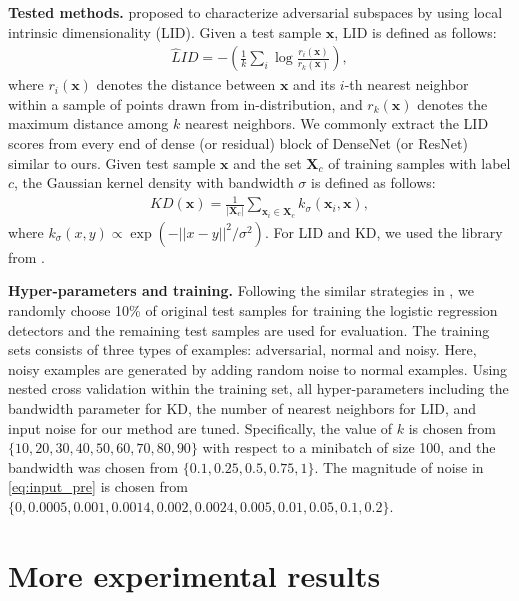 \documentclass{article}
\begin{document}
{\bf Tested methods.} \citet{ma2018characterizing} proposed to characterize adversarial subspaces by using local intrinsic dimensionality (LID). Given a test sample $\mathbf{x}$,
LID is defined as follows:
\begin{align*}
  {\widehat LID} = - \left( \frac{1}{k} \sum_i \log \frac{r_i(\mathbf{x})}{r_k(\mathbf{x})} \right),
\end{align*}
where $r_i(\mathbf{x})$ denotes the distance between $\mathbf{x}$ and its $i$-th nearest neighbor within a sample of points drawn from in-distribution, and $r_k(\mathbf{x})$ denotes the maximum distance among $k$ nearest neighbors.
We commonly extract the LID scores from every end of dense (or residual) block of DenseNet (or ResNet) similar to ours.
Given test sample $\mathbf{x}$ and the set $\mathbf{X}_c$ of training samples with label $c$,
the Gaussian kernel density with bandwidth $\sigma$ is defined as follows:
\begin{align*}
  KD(\mathbf{x}) = \frac{1}{|\mathbf{X}_c|} \sum_{\mathbf{x}_i \in \mathbf{X}_c} k_{\sigma}(\mathbf{x}_i,\mathbf{x}),
\end{align*}
where $k_{\sigma}(x,y) \propto \exp(-||x-y||^2/\sigma^2)$.
For LID and KD, we used the library from \citet{ma2018characterizing}.

{\bf Hyper-parameters and training.} Following the similar strategies in \citep{feinman2017detecting, ma2018characterizing},
we randomly choose 10\% of original test samples for training the logistic regression detectors and the remaining test samples are used for evaluation.
The training sets consists of three types of examples: adversarial, normal and noisy.
Here, noisy examples are generated by adding random noise to normal examples.
Using nested cross validation within the training set, all hyper-parameters including the bandwidth parameter for KD, the number of nearest neighbors for LID, and input noise for our method are tuned. 
Specifically, the value of $k$ is chosen from $\{10,20,30,40,50,60,70,80,90\}$ with respect to a minibatch of size 100, and the bandwidth was chosen from $\{0.1, 0.25, 0.5, 0.75, 1\}$.
The magnitude of noise in \eqref{eq:input_pre} is chosen from $\{0, 0.0005, 0.001, 0.0014, 0.002, 0.0024, 0.005, 0.01, 0.05, 0.1, 0.2 \}$. 

\section{More experimental results} \label{appendix:exp_results}
\end{document}
